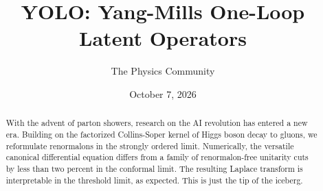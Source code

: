 \documentclass[11pt]{article}
\title{YOLO: Yang-Mills One-Loop Latent Operators}
\author{The Physics Community}
\date{October 7, 2026}
\begin{document}
\maketitle
\begin{abstract}
With the advent of parton showers, research on the AI revolution has
entered a new era. Building on the factorized Collins-Soper kernel of
Higgs boson decay to gluons, we reformulate renormalons in the strongly
ordered limit. Numerically, the versatile canonical differential
equation differs from a family of renormalon-free unitarity cuts by less
than two percent in the conformal limit. The resulting Laplace transform
is interpretable in the threshold limit, as expected. This is just the
tip of the iceberg.
\end{abstract}
\tableofcontents





\nocite{*}


\end{document}
